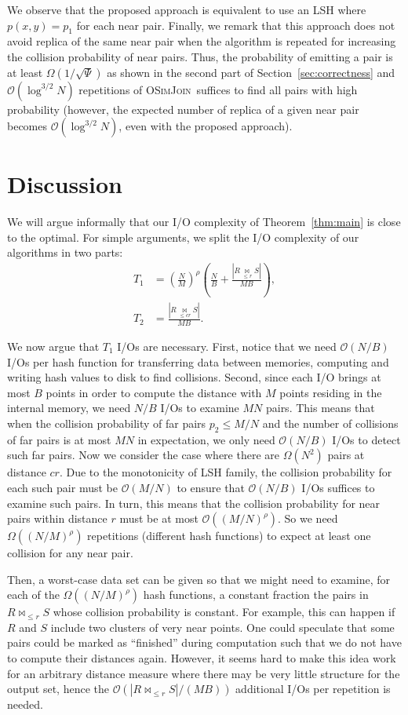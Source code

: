 \documentclass{llncs}
\newcommand{\Osymbol}{{\mathcal O}}
\newcommand{\BO}[1]{\Osymbol\left(#1\right)}
\newcommand{\BOM}[1]{\Omega\left(#1\right)}
\newcommand{\SimJoin}{\textsc{OSimJoin}}
\begin{document}
We observe that the proposed approach is equivalent to use an LSH where $p(x,y)=p_1$ for each near pair.
Finally, we  remark that this approach does not avoid replica of the same near pair when the algorithm is repeated for increasing the collision probability of near pairs. 
Thus, the probability of emitting a pair is at least $\BOM{1/\sqrt{\Psi}}$ as shown in the second part of Section~\ref{sec:correctness} and $\BO{\log^{3/2} N}$ repetitions of \SimJoin\ suffices to find all pairs with high probability (however, the expected number of replica of a given near pair becomes $\BO{\log^{3/2} N}$, even with the proposed approach).

\section{Discussion}\label{sec:exp}

We will argue informally that our I/O complexity of Theorem~\ref{thm:main} is
close to the optimal. For simple arguments, we split the I/O complexity of our
algorithms in two parts:
\begin{align*}
T_1 &= \left(\frac{N}{M}\right)^\rho \left( \frac{N}{B} + \frac{|R \underset{\leq r}{\bowtie} S|}{M B} \right), \\
T_2 &= \frac{|R \underset{\leq cr}{\bowtie} S|}{M B}.
\end{align*}


We now argue that $T_1$ I/Os are necessary. 
First, notice that we need $\BO{N/B}$ I/Os per hash function for transferring data between memories, computing and writing hash values to disk to find collisions. 
Second, since each I/O brings at most $B$ points in order to compute the distance with $M$ points residing in the internal memory, we need $N/B$ I/Os to examine $MN$ pairs. 
This means that when the collision probability of far pairs $p_2 \leq M/N$ and the number of collisions of far pairs is at most $MN$ in expectation, we only need $\BO{N/B}$ I/Os to detect such far pairs. 
Now we consider the case where there are $\BOM{N^2}$ pairs at distance $cr$. 
Due to the monotonicity of LSH family, the collision probability for each such pair must be $\BO{M/N}$ to ensure that $\BO{N/B}$ I/Os suffices to examine such pairs.
In turn, this means that the collision probability for near pairs within distance $r$ must be at most $\BO{(M/N)^\rho}$.
So we need $\BOM{(N/M)^\rho}$ repetitions (different hash functions) to expect at least one collision for any near pair.

Then, a worst-case data set can be given so that we might need to examine, for each of the $\BOM{(N/M)^\rho}$ hash functions, a constant fraction the pairs in $R \bowtie_{\leq r} S$ whose collision probability is constant.
For example, this can happen if $R$ and $S$ include two clusters of very near points.
One could speculate that some pairs could be marked as ``finished'' during computation such that we do not have to compute their distances again.
However, it seems hard to make this idea work for an arbitrary distance measure where there may be very little structure for the output set, hence the $\BO{ |R \bowtie_{\leq r} S|/(M B)}$ additional I/Os per repetition is needed. 
\end{document}
